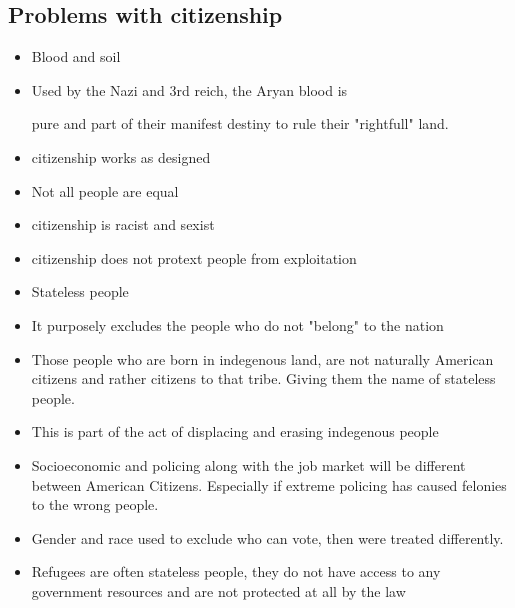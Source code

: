 \documentclass{article}
\begin{document}
\subsection{Problems with citizenship}

\begin{itemize}
  \item Blood and soil
  \item Used by the Nazi and 3rd reich, the Aryan blood is

    pure and part of their manifest destiny to rule their "rightfull" land.
  \item citizenship works as designed
  \item Not all people are equal
  \item citizenship is racist and sexist
  \item citizenship does not protext people from exploitation
  \item Stateless people

  \item It purposely excludes the people who do not "belong" to the nation
  \item Those people who are born in indegenous land, are not naturally American citizens
    and rather citizens to that tribe. Giving them the name of stateless people.
  \item This is part of the act of displacing and erasing indegenous people
  \item Socioeconomic and policing along with the job market will be different between
    American Citizens. Especially if extreme policing has caused felonies to the
    wrong people.
  \item Gender and race used to exclude who can vote, then were treated differently.
  \item Refugees are often stateless people, they do not have access to any 
    government resources and are not protected at all by the law
\end{itemize}
\end{document}
